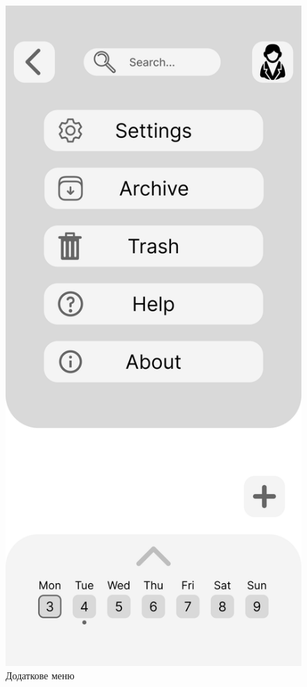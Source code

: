 \documentclass[oneside,14pt]{extarticle}
\begin{document}
\begin{normalsize}
	\begin{figure}[H]
		\begin{minipage}{0.48\textwidth}
			\centering
			\includegraphics[scale=0.13]{Frame 3}
			\caption{Додаткове меню}

\end{minipage}
\end{figure}
\end{normalsize}
\end{document}
